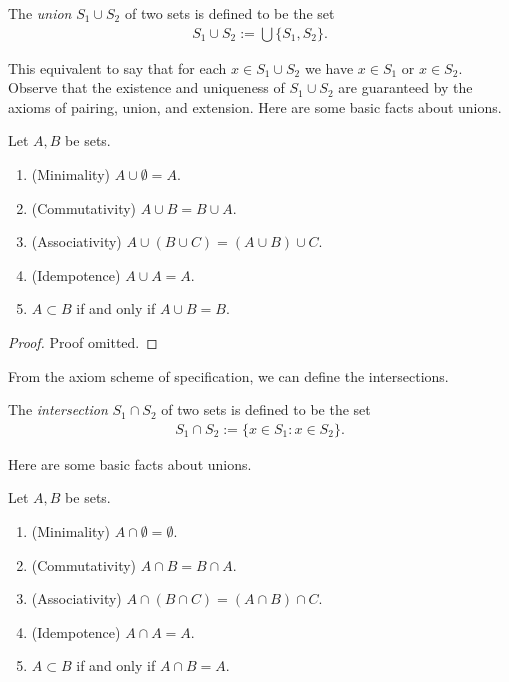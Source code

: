\begin{definition}[Unions]
    The \emph{union} $S_1 \cup S_2$ of two sets is defined to be the set
    \begin{align*}
        S_1 \cup S_2 := \bigcup\{S_1, S_2\}.
    \end{align*}
\end{definition}
This equivalent to say that for each $x \in S_1 \cup S_2$ we have $x \in S_1$ or $x \in S_2$. Observe that the existence and uniqueness of $S_1 \cup S_2$ are guaranteed by the axioms of pairing, union, and extension. Here are some basic facts about unions.

\begin{proposition}
    Let $A, B$ be sets.
    \begin{enumerate}
        \item (Minimality) $A \cup \emptyset = A$.
        \item (Commutativity) $A \cup B = B \cup A$.
        \item (Associativity) $A \cup (B \cup C) = (A \cup B) \cup C$.
        \item (Idempotence) $A \cup A = A$.
        \item $A \subset B$ if and only if $A \cup B = B$.
    \end{enumerate}
\end{proposition}

\begin{proof}
Proof omitted.
\end{proof}

From the axiom scheme of specification, we can define the intersections.
\begin{definition}[Intersections]
    The \emph{intersection} $S_1 \cap S_2$ of two sets is defined to be the set
    \begin{align*}
        S_1 \cap S_2 := \{x \in S_1 : x \in S_2\}.
    \end{align*}
\end{definition}

Here are some basic facts about unions.

\begin{proposition}
    Let $A, B$ be sets.
    \begin{enumerate}
        \item (Minimality) $A \cap \emptyset = \emptyset$.
        \item (Commutativity) $A \cap B = B \cap A$.
        \item (Associativity) $A \cap (B \cap C) = (A \cap B) \cap C$.
        \item (Idempotence) $A \cap A = A$.
        \item $A \subset B$ if and only if $A \cap B = A$.
    \end{enumerate}
\end{proposition}

